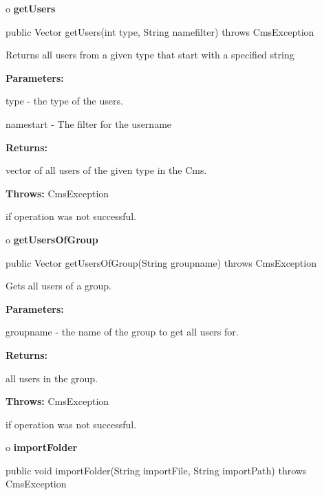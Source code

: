 o {\bf getUsers} 

\begin{PRE}
 public Vector getUsers(int type,
                        String namefilter) throws CmsException
\end{PRE}

\begin{description}
\htmlDD Returns all users from a given type that start with a specified string


\begin{description}
\item {\bf Parameters:}  

type - the type of the users.  

namestart - The filter for the username  
\item {\bf Returns:}  

vector of all users of the given type in the Cms.  
\item {\bf Throws:} CmsException  

if operation was not successful.  
\end{description}

\end{description}

o {\bf getUsersOfGroup} 

\begin{PRE}
 public Vector getUsersOfGroup(String groupname) throws CmsException
\end{PRE}

\begin{description}
\htmlDD Gets all users of a group. 

\begin{description}
\item {\bf Parameters:}  

groupname - the name of the group to get all users for.  
\item {\bf Returns:}  

all users in the group.  
\item {\bf Throws:} CmsException  

if operation was not successful.  
\end{description}

\end{description}

o {\bf importFolder} 

\begin{PRE}
 public void importFolder(String importFile,
                          String importPath) throws CmsException
\end{PRE}


